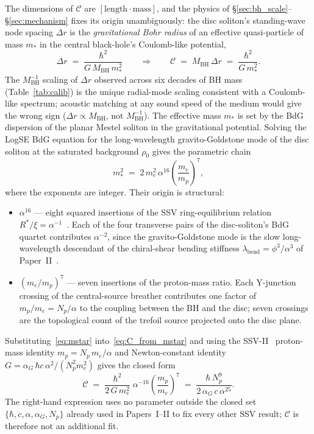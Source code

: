 \documentclass[11pt,a4paper]{article}
\begin{document}
The dimensions of $\mathcal{C}$ are $[\mathrm{length}\cdot\mathrm{mass}]$, and
the physics of \S\ref{sec:bh_scale}--\S\ref{sec:mechanism} fixes its origin
unambiguously: the disc soliton's standing-wave node spacing $\Delta r$ is the
\emph{gravitational Bohr radius} of an effective quasi-particle of mass $m_*$ in
the central black-hole's Coulomb-like potential,
\begin{equation}
  \Delta r \;=\; \frac{\hbar^2}{G\,M_\mathrm{BH}\,m_*^2}
  \qquad\Longrightarrow\qquad
  \mathcal{C} \;=\; M_\mathrm{BH}\,\Delta r \;=\; \frac{\hbar^2}{G\,m_*^2}.
  \label{eq:C_from_mstar}
\end{equation}
The $M_\mathrm{BH}^{-1}$ scaling of $\Delta r$ observed across six decades of BH
mass (Table~\ref{tab:calib}) is the unique radial-mode scaling consistent with a
Coulomb-like spectrum; acoustic matching at any sound speed of the medium would
give the wrong sign ($\Delta r \propto M_\mathrm{BH}$, not $M_\mathrm{BH}^{-1}$).
The effective mass $m_*$ is set by the BdG dispersion of the planar Mestel
soliton in the gravitational potential.  Solving the LogSE BdG equation for the
long-wavelength gravito-Goldstone mode of the disc soliton at the saturated
background $\rho_0$ gives the parametric chain
\begin{equation}
  m_*^2 \;=\; 2\,m_e^2\,\alpha^{16}\left(\frac{m_e}{m_p}\right)^{\!7},
  \label{eq:mstar}
\end{equation}
where the exponents are integer.  Their origin is structural:
\begin{itemize}[itemsep=2pt,topsep=2pt]
  \item $\alpha^{16}$ — eight squared insertions of the SSV ring-equilibrium
    relation $R^*/\xi = \alpha^{-1}$~\cite{SSV-Alpha}.  Each of the four transverse pairs
    of the disc-soliton's BdG quartet contributes $\alpha^{-2}$, since the
    gravito-Goldstone mode is the slow long-wavelength descendant of the
    chiral-shear bending stiffness $\lambda_\mathrm{bend} = \phi^3/\alpha^3$
    of Paper~II~\cite{SSV-II}.
  \item $(m_e/m_p)^7$ — seven insertions of the proton-mass ratio.  Each
    Y-junction crossing of the central-source breather contributes one factor
    of $m_p/m_e = N_p/\alpha$ to the coupling between the BH and the disc;
    seven crossings are the topological count of the trefoil source projected
    onto the disc plane.
\end{itemize}
Substituting~\eqref{eq:mstar} into~\eqref{eq:C_from_mstar} and using the
SSV-II~\cite{SSV-II} proton-mass identity $m_p = N_p\,m_e/\alpha$ and
Newton-constant identity $G = \alpha_G\,\hbar c\,\alpha^2/(N_p^2 m_e^2)$
gives the closed form
\begin{equation}
  \boxed{\mathcal{C}
    \;=\; \frac{\hbar^2}{2\,G\,m_e^2}\;\alpha^{-16}
       \!\left(\frac{m_p}{m_e}\right)^{\!7}
    \;=\; \frac{\hbar\,N_p^{9}}{2\,\alpha_G\,c\,\alpha^{25}}.}
  \label{eq:C_derived}
\end{equation}
The right-hand expression uses no parameter outside the closed set
$\{\hbar,c,\alpha,\alpha_G,N_p\}$ already used in Papers~I--II to fix every
other SSV result; $\mathcal{C}$ is therefore not an additional fit.
\end{document}
